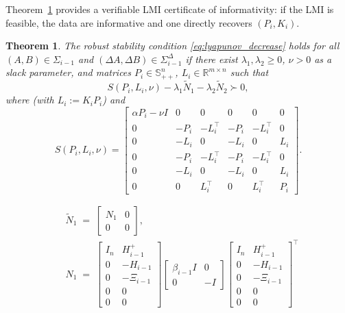 \documentclass[letterpaper, 10 pt, conference]{ieeeconf}
\newtheorem{theorem}{Theorem}
\begin{document}
Theorem~\ref{thm:lmi_stability} provides a verifiable LMI certificate of informativity: if the LMI is feasible, the data are informative and one directly recovers $(P_i,K_i)$.

\begin{theorem}\label{thm:lmi_stability}
The robust stability condition \eqref{eq:lyapunov_decrease} holds for all $(A,B)\in\Sigma_{i-1}$ and $(\Delta A,\Delta B)\in\Sigma_{i-1}^\Delta$ if there exist $\lambda_1,\lambda_2\ge0$, $\nu>0$ as a slack parameter, and matrices $P_i\in \mathbb{S}^n_{++}$, $L_i \in \mathbb{R}^{m\times n}$ such that
\begin{equation}\label{eq:lmi_stability}
S(P_i, L_i, \nu)-\lambda_1 \widetilde{N}_1-\lambda_2 \widetilde{N}_2 \succ 0,
\end{equation}
where (with $L_i := K_i P_i$) and
\[
S(P_i,L_i,\nu)=
\begin{bmatrix}
\alpha P_i-\nu I & 0 & 0 & 0 & 0 & 0\\
0 & -P_i & -L_i^\top & -P_i & -L_i^\top & 0\\
0 & -L_i & 0 & -L_i & 0 & L_i\\
0 & -P_i & -L_i^\top & -P_i & -L_i^\top & 0\\
0 & -L_i & 0 & -L_i & 0 & L_i\\
0 & 0 & L_i^\top & 0 & L_i^\top & P_i
\end{bmatrix}.
\]

\begin{align*}
&\widetilde N_1\;=\;
\begin{bmatrix}
N_1 & 0\\
0   & 0
\end{bmatrix},\\
&N_1 \;=\;
\begin{bmatrix}
I_n & {H_{i-1}^+} \\  0& -H_{i-1} \\ 0 & -\Xi_{i-1} \\ 0 & 0 \\ 0& 0
\end{bmatrix}
\begin{bmatrix}
    \beta_{i-1}I & 0 \\ 0 & -I
\end{bmatrix}
\begin{bmatrix}
I_n & {H_{i-1}^+} \\  0& -H_{i-1} \\ 0 & -\Xi_{i-1} \\ 0 & 0 \\ 0& 0
\end{bmatrix}^\top
\end{align*}


\end{theorem}
\end{document}
